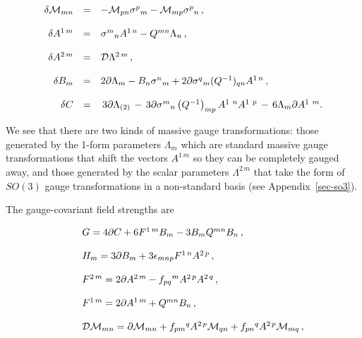 \documentclass[12pt,a4paper]{article}
\begin{document}
\begin{equation}
\begin{array}{rcl}
\delta {\cal M}_{mn} & = & -{\cal M}_{pn}\sigma^{p}{}_{m}
-{\cal M}_{mp}\sigma^{p}{}_{n}\, ,\\
& & \\
\delta A^{1\, m} & = & \sigma^{m}{}_{n}A^{1\, n} -Q^{mn}\Lambda_{n}\, ,\\
& & \\
\delta A^{2\, m} & = & {\cal D}\Lambda^{2\, m}\, ,\\
& & \\
\delta B_{m} & = & 2\partial\Lambda_{m} -B_{n}\sigma^{n}{}_{m} 
+2 \partial\sigma^{q}{}_{m}(Q^{-1})_{qn} A^{1\, n}\, ,\\
& & \\
\delta C & = & \, 3\partial\Lambda_{(2)}
     \,-\, 3\partial\sigma^{m}{}_{n}\left( Q^{-1}\right)_{mp}A^{1\ n}A^{1\ p}
          \,-\,6\Lambda_{m}\partial A^{1\ m}.\\
\end{array}
\end{equation}

We see that there are two kinds of massive gauge transformations:
those generated by the 1-form parameters $\Lambda_{m}$ which are
standard massive gauge transformations that shift the vectors $A^{1\,
  m}$ so they can be completely gauged away, and those generated by
the scalar parameters $\Lambda^{2\, m}$ that take the form of $SO(3)$
gauge transformations in a non-standard basis (see
Appendix~\ref{sec-so3}).

The gauge-covariant field strengths are

\begin{equation}
\label{eq:massivefieldstrengths}
\begin{array}{rcl}
& & G = 4 \partial C +6 F^{1\, m} B_{m}-3B_{m}Q^{mn}B_{n}\, ,\\
& & \\
& & H_{m} = 3\partial B_{m} +3\epsilon_{mnp}F^{1\, n}A^{2\, p}\, ,\\
& & \\
& & F^{2\, m} = 2\partial A^{2\, m}-f_{pq}{}^{m}A^{2\, p}A^{2\, q}
\, ,\\
& &\\
& & F^{1\, m} = 2\partial A^{1\, m}+Q^{mn}B_{n}\, ,\\
& & \\
& & {\cal D}{\cal M}_{mn} = 
\partial {\cal M}_{mn}+f_{pm}{}^{q}A^{2\, p}{\cal M}_{qn}
+f_{pn}{}^{q}A^{2\, p}{\cal M}_{mq}\, ,\\
\end{array}
\end{equation}
\end{document}
